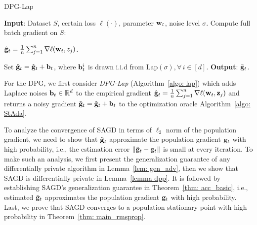 \documentclass[11pt]{article}
\begin{document}
\begin{algorithm}[h!]
\caption{DPG-Lap}
\begin{algorithmic}[1]
\label{algo: lap}
	\STATE \textbf{Input}: Dataset $S$,  certain loss $\ell(\cdot)$, parameter $\mathbf{w}_t$, noise level $\sigma$.
	\STATE Compute full batch gradient on $S$: \\
	\centerline{ $\hat {\mathbf{g}}_t = \frac{1}{n} \sum_{j=1}^n\nabla \ell(\mathbf{w}_t, z_j)$.}	
	\STATE Set $\tilde {\mathbf{g}}_t = \hat {\mathbf{g}}_t + \mathbf{b}_t$, where $\mathbf{b}_t^i$ is drawn i.i.d from Lap$(\sigma), \forall\, i \in [d]$.
	\STATE \textbf{Output}: $\tilde {\mathbf{g}}_t$.
	\end{algorithmic}
\end{algorithm}


For the DPG, we first consider
\emph{DPG-Lap} (Algorithm~\ref{algo: lap}) which adds Laplace noises $\mathbf{b}_t \in \mathbb{R}^d$ to the empirical gradient $\hat {\mathbf{g}}_t = \frac{1}{n} \sum_{j=1}^n\nabla \ell(\mathbf{w}_t, \mathbf{z}_j)$ and returns a noisy gradient $\tilde {\mathbf{g}}_t = \hat {\mathbf{g}}_t + \mathbf{b}_t$ to the optimization oracle Algorithm~\ref{algo: StAda}. 

To analyze the convergence of SAGD in terms of $\ell_2$ norm of the population gradient, we need to 
show that $\tilde {\mathbf{g}}_t$ approximate the population gradient $\mathbf{g}_t$ with high probability, i.e., the estimation error $\| \tilde {\mathbf{g}}_t - \mathbf{g}_t\|$ is small at every iteration.  To make such an analysis, we first present the generalization guarantee of any differentially private algorithm in Lemma~\ref{lem: gen_adv}, then we show that SAGD is differentially private in Lemma~\ref{lemma dpp}. It is followed by establishing SAGD's generalization guarantee in Theorem~\ref{thm: acc_basic}, i.e., estimated $\tilde {\mathbf{g}}_t$ approximates the population gradient $\mathbf{g}_t$ with high probability. Last, we prove that SAGD converges to a population stationary point with high probability in Theorem~\ref{thm: main_rmsprop}.
\end{document}
